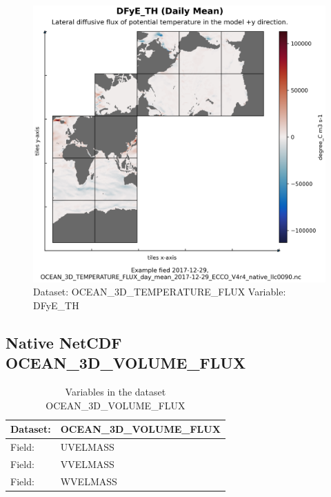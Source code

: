 \begin{figure}[H]
\centering
\includegraphics[scale=0.55]{../images/plots/native_plots/Ocean_Three-Dimensional_Potential_Temperature_Fluxes/DFyE_TH.png}
\caption{Dataset: OCEAN\_3D\_TEMPERATURE\_FLUX Variable: DFyE\_TH}
\label{tab:table-OCEAN_3D_TEMPERATURE_FLUX_DFyE_TH-Plot}
\end{figure}
\pagebreak
\subsection{Native NetCDF OCEAN\_3D\_VOLUME\_FLUX}
\newp
\begin{longtable}{|p{}|p{}|}
\caption{Variables in the dataset OCEAN\_3D\_VOLUME\_FLUX}
\label{tab:table-OCEAN_3D_VOLUME_FLUX-fields} \\ 
\hline \endhead \hline \endfoot
\rowcolor{lightgray} \textbf{Dataset:} & \textbf{OCEAN\_3D\_VOLUME\_FLUX} \\ \hline
Field: &UVELMASS \\ \hline
Field: &VVELMASS \\ \hline
Field: &WVELMASS \\ \hline
\end{longtable}

\pagebreak
